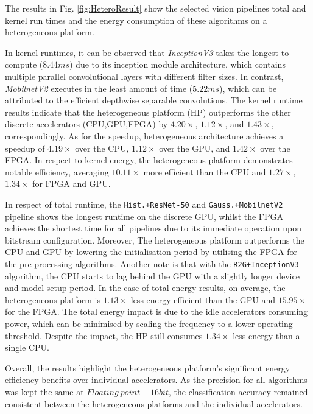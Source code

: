 \documentclass[]{spie}  %
\begin{document}
The results in Fig. \ref{fig:HeteroResult} show the selected vision pipelines total and kernel run times and the energy consumption of these algorithms on a heterogeneous platform.

In kernel runtimes, it can be observed that \textit{InceptionV3} takes the longest to compute ($8.44ms$) due to its inception module architecture, which contains multiple parallel convolutional layers with different filter sizes. In contrast, \textit{MobilnetV2} executes in the least amount of time ($5.22ms$), which can be attributed to the efficient depthwise separable convolutions. The kernel runtime results indicate that the heterogeneous platform (HP) outperforms the other discrete accelerators (CPU,GPU,FPGA) by $4.20\times$, $1.12\times$, and $1.43\times$, correspondingly.  As for the speedup, heterogeneous architecture achieves a speedup of \(4.19\times\) over the CPU, \(1.12\times\) over the GPU, and \(1.42\times\) over the FPGA. In respect to kernel energy, the heterogeneous platform demonstrates notable efficiency, averaging \(10.11\times\) more efficient than the CPU and \(1.27\times\), \(1.34\times\) for FPGA and GPU.

In respect of total runtime, the \texttt{Hist.+ResNet-50} and \texttt{Gauss.+MobilnetV2} pipeline shows the longest runtime on the discrete GPU, whilst the FPGA achieves the shortest time for all pipelines due to its immediate operation upon bitstream configuration. Moreover, The heterogeneous platform outperforms the CPU and GPU by lowering the initialisation period by utilising the FPGA for the pre-processing algorithms. Another note is that with the \texttt{R2G+InceptionV3} algorithm, the CPU starts to lag behind the GPU with a slightly longer device and model setup period. In the case of total energy results, on average, the heterogeneous platform is $1.13\times$ less energy-efficient than the GPU and $15.95\times$ for the FPGA. The total energy impact is due to the idle accelerators consuming power, which can be minimised by scaling the frequency to a lower operating threshold. Despite the impact, the HP still consumes $1.34\times$ less energy than a single CPU.

Overall, the results highlight the heterogeneous platform's significant energy efficiency benefits over individual accelerators. As the precision for all algorithms was kept the same at $Floating\ point-16 bit$, the classification accuracy remained consistent between the heterogeneous platforms and the individual accelerators.
\end{document}
